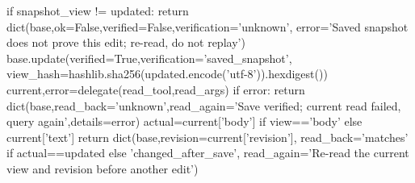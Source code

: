        if snapshot_view != updated:
            return dict(base,ok=False,verified=False,verification='unknown',
                        error='Saved snapshot does not prove this edit; re-read, do not replay')
        base.update(verified=True,verification='saved_snapshot',
                    view_hash=hashlib.sha256(updated.encode('utf-8')).hexdigest())
        current,error=delegate(read_tool,read_args)
        if error:
            return dict(base,read_back='unknown',read_again='Save verified; current read failed, query again',details=error)
        actual=current['body'] if view=='body' else current['text']
        return dict(base,revision=current['revision'],
                    read_back='matches' if actual==updated else 'changed_after_save',
                    read_again='Re-read the current view and revision before another edit')


